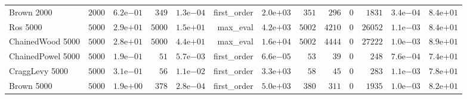 \begin{longtable}[c]{lrrrrrrrrrrrr}
Brown 2000 & \( 2000\) & \( 6.2\)e\(-01\) & \(  349\) & \( 1.3\)e\(-04\) & first\_order & \( 2.0\)e\(+03\) & \(  351\) & \(  296\) & \(    0\) & \( 1831\) & \( 3.4\)e\(-04\) & \( 8.4\)e\(+01\) \\
Ros 5000 & \( 5000\) & \( 2.9\)e\(+01\) & \( 5000\) & \( 1.5\)e\(+01\) & max\_eval & \( 4.2\)e\(+03\) & \( 5002\) & \( 4210\) & \(    0\) & \(26052\) & \( 1.1\)e\(-03\) & \( 8.4\)e\(+01\) \\
ChainedWood 5000 & \( 5000\) & \( 2.8\)e\(+01\) & \( 5000\) & \( 4.4\)e\(+01\) & max\_eval & \( 1.6\)e\(+04\) & \( 5002\) & \( 4444\) & \(    0\) & \(27222\) & \( 1.0\)e\(-03\) & \( 8.9\)e\(+01\) \\
ChainedPowel 5000 & \( 5000\) & \( 1.9\)e\(-01\) & \(   51\) & \( 5.7\)e\(-03\) & first\_order & \( 6.6\)e\(-05\) & \(   53\) & \(   39\) & \(    0\) & \(  248\) & \( 7.6\)e\(-04\) & \( 7.4\)e\(+01\) \\
CraggLevy 5000 & \( 5000\) & \( 3.1\)e\(-01\) & \(   56\) & \( 1.1\)e\(-02\) & first\_order & \( 3.3\)e\(+03\) & \(   58\) & \(   45\) & \(    0\) & \(  283\) & \( 1.1\)e\(-03\) & \( 7.8\)e\(+01\) \\
Brown 5000 & \( 5000\) & \( 1.9\)e\(+00\) & \(  378\) & \( 2.8\)e\(-04\) & first\_order & \( 5.0\)e\(+03\) & \(  380\) & \(  311\) & \(    0\) & \( 1935\) & \( 1.0\)e\(-03\) & \( 8.2\)e\(+01\) \\
\hline 
\end{longtable}



